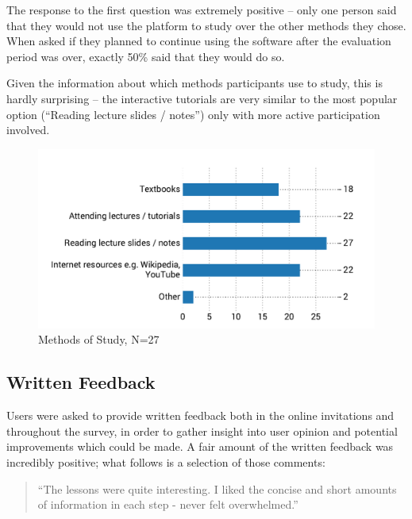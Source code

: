 \documentclass[bsc,twoside,singlespacing,parskip,logo,notimes,normalheadings]{infthesis}
\begin{document}
    The response to the first question was extremely positive -- only
    one person said that they would not use the platform to study over
    the other methods they chose. When asked if they planned to
    continue using the software after the evaluation period was over,
    exactly 50\% said that they would do so.
    
    Given the information about which methods participants use to
    study, this is hardly surprising -- the interactive tutorials are
    very similar to the most popular option (``Reading lecture slides
    / notes'') only with more active participation involved.

    \begin{figure}[!htb]
      \centering
      \includegraphics[width=\textwidth, trim=0 0 0 32, clip]{img/learning_methods.pdf}
      \captionsetup{width=\textwidth, justification=centering}
      \caption{Methods of Study, N=27}\label{fig:study-methods}
    \end{figure}

    \subsection{Written Feedback}
    
    Users were asked to provide written feedback both in the online
    invitations and throughout the survey, in order to gather insight
    into user opinion and potential improvements which could be
    made. A fair amount of the written feedback was incredibly
    positive; what follows is a selection of those comments:

    \begin{quote}
      \vspace{1mm}
      ``The lessons were quite interesting. I liked the concise and
      short amounts of information in each step - never felt
      overwhelmed.''
      \vspace{1mm}
    \end{quote}
\end{document}
